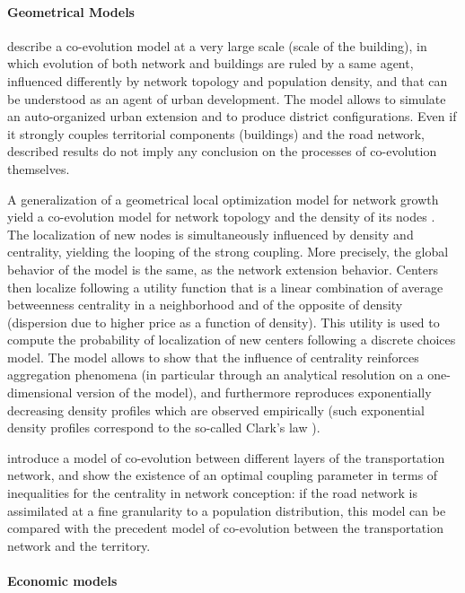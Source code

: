 \documentclass[11pt]{article}
\begin{document}
\paragraph{Geometrical Models}

\cite{achibet2014model} describe a co-evolution model at a very large scale (scale of the building), in which evolution of both network and buildings are ruled by a same agent, influenced differently by network topology and population density, and that can be understood as an agent of urban development. The model allows to simulate an auto-organized urban extension and to produce district configurations. Even if it strongly couples territorial components (buildings) and the road network, described results do not imply any conclusion on the processes of co-evolution themselves.

A generalization of a geometrical local optimization model for network growth yield a co-evolution model for network topology and the density of its nodes \citep{barthelemy2009co}. The localization of new nodes is simultaneously influenced by density and centrality, yielding the looping of the strong coupling. More precisely, the global behavior of the model is the same, as the network extension behavior. Centers then localize following a utility function that is a linear combination of average betweenness centrality in a neighborhood and of the opposite of density (dispersion due to higher price as a function of density). This utility is used to compute the probability of localization of new centers following a discrete choices model. The model allows to show that the influence of centrality reinforces aggregation phenomena (in particular through an analytical resolution on a one-dimensional version of the model), and furthermore reproduces exponentially decreasing density profiles which are observed empirically (such exponential density profiles correspond to the so-called Clark's law \citep{chen2010new}).


\cite{ding2017heuristic} introduce a model of co-evolution between different layers of the transportation network, and show the existence of an optimal coupling parameter in terms of inequalities for the centrality in network conception: if the road network is assimilated at a fine granularity to a population distribution, this model can be compared with the precedent model of co-evolution between the transportation network and the territory.




\paragraph{Economic models}
\end{document}
